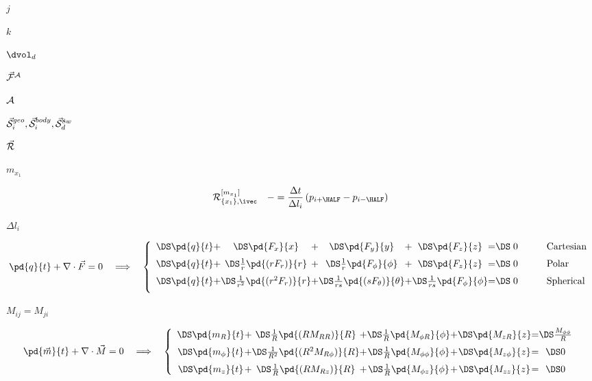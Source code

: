 \documentclass{article}
\begin{document}
$ j $
\pagebreak

$ k $
\pagebreak

$ \dvol_d $
\pagebreak

$ \vec{\cal F}^{\cal A} $
\pagebreak

$ {\cal A} $
\pagebreak

$ \vec{\cal S}^{geo}_i, \vec{\cal S}^{body}_i, 
 \vec{\cal S}^{8w}_d $
\pagebreak

$ \vec{\cal R} $
\pagebreak

$ m_{x_1} $
\pagebreak

\[  {\cal R}_{\{x_1\},\ivec}^{[m_{x_1}]} \quad -= \frac{\Delta t}{\Delta l_i}
                     \left(p_{i+\HALF} - p_{i-\HALF}\right)
\]
\pagebreak

$ \Delta l_i $
\pagebreak

\[   \pd{q}{t} + \nabla\cdot\vec{F} = 0\quad\Longrightarrow\quad
   \left\{\begin{array}{c@{+}c@{+}c@{+}c@{=}cl}
   \DS \pd{q}{t}  & \DS
   \pd{F_x}{x}    & \DS
   \pd{F_y}{y}    & \DS
   \pd{F_z}{z}    & \DS\; 0 &\qquad\textrm{Cartesian}
   \\ \noalign{\medskip}
   \DS \pd{q}{t}                   & \DS
   \frac{1}{r}\pd{(rF_{r})}{r}     & \DS
   \frac{1}{r}\pd{F_{\phi}}{\phi}  & \DS
              \pd{F_z}{z}          &  \DS \;0 & \qquad\textrm{Polar}
   \\ \noalign{\medskip}
   \DS \pd{q}{t}                   & \DS
   \frac{1}{r^2}\pd{(r^2F_{r})}{r} & \DS
   \frac{1}{rs}\pd{(s F_{\theta})}{\theta}  & \DS
   \frac{1}{rs}\pd{F_\phi}{\phi}            & \DS\;  0 &\qquad\textrm{Spherical}
   \\ \noalign{\medskip}
   \end{array}\right.
\]
\pagebreak

$ M_{ij} = M_{ji} $
\pagebreak

\[     \pd{\vec{m}}{t} + \nabla\cdot\vec{M} = 0
       \quad \Longrightarrow \quad \left\{
     \begin{array}{c@{+}c@{+}c@{+}c@{=}c}
     \DS \pd{m_{R}}{t}                              & \DS
     \frac{1}{R}\pd{(RM_{RR})}{R}        & \DS
     \frac{1}{R}\pd{M_{\phi R}}{\phi} & \DS
            \pd{  M_{zR}}{z}        & \DS
     \frac{M_{\phi\phi}}{R}
     \\ \noalign{\medskip}
     \DS \pd{m_{\phi}}{t}                     & \DS
     \frac{1}{R^2}\pd{(R^2M_{R    \phi})}{R}    & \DS
     \frac{1}{R}  \pd{    M_{\phi \phi}}{\phi}  & \DS
                  \pd{    M_{z    \phi}}{z}     & \DS
           0
     \\ \noalign{\medskip}
     \DS \pd{m_z}{t}                   & \DS
     \frac{1}{R}\pd{(R  M_{Rz})}{R}   & \DS
     \frac{1}{R}\pd{M_{\phi z}}{\phi} & \DS
            \pd{M_{zz}}{z}        & \DS 0
     \end{array}\right.
\]
\pagebreak
\end{document}
